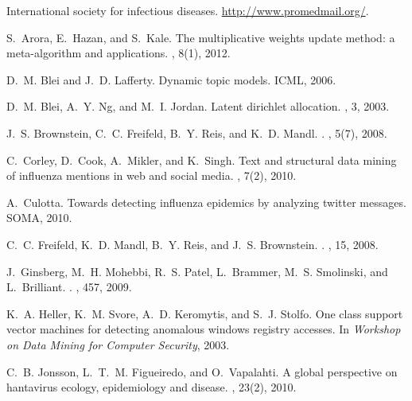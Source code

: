 \documentclass[twoside,leqno,twocolumn]{article}
\begin{document}
\vspace{-10pt}\begin{thebibliography}{10}
\vspace{-15pt}
International society for infectious diseases.
\newblock \url{http://www.promedmail.org/}.

S.~Arora, E.~Hazan, and S.~Kale.
\newblock The multiplicative weights update method: a meta-algorithm and
  applications.
, 8(1), 2012.

D.~M. Blei and J.~D. Lafferty.
\newblock Dynamic topic models.
\newblock ICML, 2006.

D.~M. Blei, A.~Y. Ng, and M.~I. Jordan.
\newblock Latent dirichlet allocation.
, 3, 2003.

J.~S. Brownstein, C.~C. Freifeld, B.~Y. Reis, and K.~D. Mandl.
.
, 5(7), 2008.

C.~Corley, D.~Cook, A.~Mikler, and K.~Singh.
\newblock Text and structural data mining of influenza mentions in web and
  social media.
, 7(2), 2010.

A.~Culotta.
\newblock Towards detecting influenza epidemics by analyzing twitter messages.
\newblock SOMA, 2010.

C.~C. Freifeld, K.~D. Mandl, B.~Y. Reis, and J.~S. Brownstein.
.
, 15, 2008.

J.~Ginsberg, M.~H. Mohebbi, R.~S. Patel, L.~Brammer, M.~S. Smolinski, and
  L.~Brilliant.
.
, 457, 2009.

K.~A. Heller, K.~M. Svore, A.~D. Keromytis, and S.~J. Stolfo.
\newblock One class support vector machines for detecting anomalous windows
  registry accesses.
\newblock In {\em Workshop on Data Mining for Computer Security}, 2003.

C.~B. Jonsson, L.~T.~M. Figueiredo, and O.~Vapalahti.
\newblock A global perspective on hantavirus ecology, epidemiology and disease.
, 23(2), 2010.


\end{thebibliography}
\end{document}
